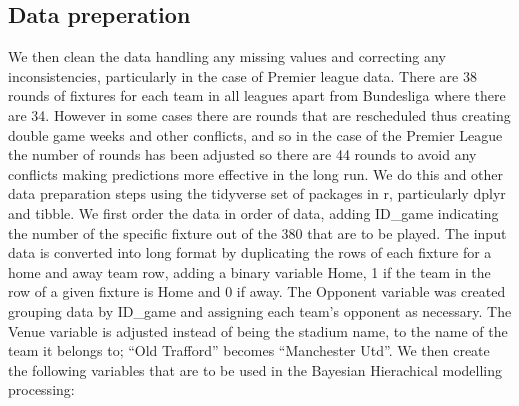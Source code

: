 \documentclass[
]{article}
\begin{document}
\hypertarget{data-preperation}{%
\subsection{Data preperation}\label{data-preperation}}

We then clean the data handling any missing values and correcting any
inconsistencies, particularly in the case of Premier league data. There
are 38 rounds of fixtures for each team in all leagues apart from
Bundesliga where there are 34. However in some cases there are rounds
that are rescheduled thus creating double game weeks and other
conflicts, and so in the case of the Premier League the number of rounds
has been adjusted so there are 44 rounds to avoid any conflicts making
predictions more effective in the long run. We do this and other data
preparation steps using the tidyverse set of packages in r, particularly
dplyr and tibble. We first order the data in order of data, adding
ID\_game indicating the number of the specific fixture out of the 380
that are to be played. The input data is converted into long format by
duplicating the rows of each fixture for a home and away team row,
adding a binary variable Home, 1 if the team in the row of a given
fixture is Home and 0 if away. The Opponent variable was created
grouping data by ID\_game and assigning each team's opponent as
necessary. The Venue variable is adjusted instead of being the stadium
name, to the name of the team it belongs to; ``Old Trafford'' becomes
``Manchester Utd''. We then create the following variables that are to
be used in the Bayesian Hierachical modelling processing:
\end{document}
